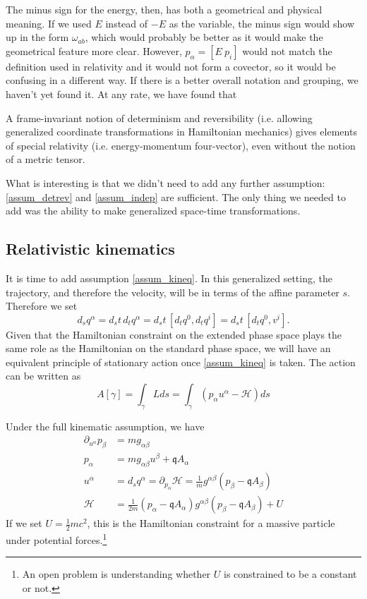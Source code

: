 The minus sign for the energy, then, has both a geometrical and physical meaning. If we used $E$ instead of $-E$ as the variable, the minus sign would show up in the form $\omega_{ab}$, which would probably be better as it would make the geometrical feature more clear. However, $p_\alpha = [ E \ p_i]$ would not match the definition used in relativity and it would not form a covector, so it would be confusing in a different way. If there is a better overall notation and grouping, we haven't yet found it. At any rate, we have found that
\begin{insight}
	A frame-invariant notion of determinism and reversibility (i.e. allowing generalized coordinate transformations in Hamiltonian mechanics) gives elements of special relativity (i.e. energy-momentum four-vector), even without the notion of a metric tensor.
\end{insight}

What is interesting is that we didn't need to add any further assumption: \ref{assum_detrev} and \ref{assum_indep} are sufficient. The only thing we needed to add was the ability to make generalized space-time transformations.

\subsection{Relativistic kinematics}

It is time to add assumption \ref{assum_kineq}. In this generalized setting, the trajectory, and therefore the velocity, will be in terms of the affine parameter $s$. Therefore we set
\begin{equation}
	d_s q^\alpha  = d_s t \, d_t q^\alpha = d_s t \, [ d_t q^0, d_t q^i  ] = d_s t \, [ d_t q^0, v^i  ] .
\end{equation}
Given that the Hamiltonian constraint on the extended phase space plays the same role as the Hamiltonian on the standard phase space, we will have an equivalent principle of stationary action once \ref{assum_kineq} is taken. The action can be written as
\begin{equation}
	A[\gamma] = \int_\gamma Lds = \int_\gamma \left( p_\alpha u^\alpha - \mathcal{H} \right) ds
\end{equation}

Under the full kinematic assumption, we have
\begin{equation}
	\begin{aligned}
	\partial_{u^\alpha} p_\beta &= mg_{\alpha \beta} \\
	p_{\alpha} &= mg_{\alpha \beta} u^\beta + \mathfrak{q} A_{\alpha} \\
u^{\alpha} &= d_s q^\alpha = \partial_{p_\alpha} \mathcal{H} = \frac{1}{m} g^{\alpha \beta} (p_\beta - \mathfrak{q} A_\beta) \\
\mathcal{H} &= \frac{1}{2m}\left(p_\alpha - \mathfrak{q} A_{\alpha}\right)g^{\alpha \beta} \left(p_\beta - \mathfrak{q} A_{\beta}\right) + U
	\end{aligned}
\end{equation}
If we set $U=\frac{1}{2} m c^2$, this is the Hamiltonian constraint for a massive particle under potential forces.\footnote{An open problem is understanding whether $U$ is constrained to be a constant or not.}

